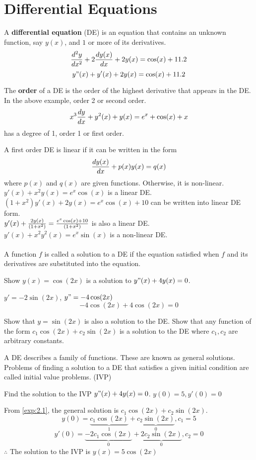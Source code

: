 \documentclass[english, 12pt]{article}
\begin{document}
\section{Differential Equations}
\begin{defn}\label{def:de}
A \textbf{differential equation} (DE) is an equation that contains an unknown function, say $y(x)$, and $1$ or more of its derivatives.
\[ \frac{d^2 y}{dx^2} + 2 \frac{dy(x)}{dx} + 2 y(x) = \cos (x) + 11.2 \]
\[ y"(x) + y'(x) + 2y(x) = \cos(x) + 11.2 \]
\end{defn}
\begin{defn}
The \textbf{order} of a DE is the order of the highest derivative that appears in the DE. In the above example, order 2 or second order.
\[ x^3 \frac{dy}{dx} + y^2(x) + y(x) = e^x + \cos(x) + x \]
has a degree of 1, order 1 or first order.
\end{defn}
A first order DE is linear if it can be written in the form 
\[ \frac{dy(x)}{dx} + p(x)y(x) = q(x) \]
where $p(x)$ and $q(x)$ are given functions. Otherwise, it is non-linear.\\
$y'(x) + x^2 y(x) = e^x\cos(x)$ is a linear DE.\\
$(1+x^2)y'(x) + 2y(x) = e^x \cos(x) + 10$ can be written into linear DE form. \\
$y'(x) + \frac{2y(x)}{(1+x^2)} =\frac{e^x \cos(x) + 10}{(1+x^2)}$ is also a linear DE. \\
$y'(x) + x^2 y^2(x) = e^x\sin(x)$ is a non-linear DE.\\\\
A function $f$ is called a solution to a DE if the equation satisfied when $f$ and its derivatives are substituted into the equation.
\begin{exmp}\label{exp:2.1}
Show $y(x) = \cos(2x)$ is a solution to $y"(x) + 4y(x) = 0$.
\begin{sol}
$y'=-2 \sin(2x)$, $y" = -4 \cos(2x)$
\[-4 \cos(2x) + 4 \cos(2x) = 0 \]
\end{sol}
\begin{exercise}
Show that $y=\sin(2x)$ is also a solution to the DE. Show that any function of the form $c_{1}\cos(2x) + c_{2}\sin(2x)$ is a solution to the DE where $c_{1},c_{2}$ are arbitrary constants.
\end{exercise}
\end{exmp}
\begin{note}
A DE describes a family of functions. These are known as general solutions. Problems of finding a solution to a DE that satisfies a given initial condition are called initial value problems. (IVP)
\end{note}
\begin{exmp}
Find the solution to the IVP $y"(x) + 4y(x) = 0$. $y(0) = 5, y'(0) = 0$
\end{exmp}
\begin{sol}
From \ref{exp:2.1}, the general solution is $c_{1}\cos(2x) + c_{2}\sin(2x)$.
\[y(0)=\underbrace{c_{1}\cos(2x)}_{1} + \underbrace{c_{2}\sin(2x)}_{0}, c_{1} = 5 \]
\[y'(0)=\underbrace{-2 c_{1}\cos(2x)}_{0} + \underbrace{2 c_{2}\sin(2x)}_{0}, c_{2} = 0 \]
$\therefore$ The solution to the IVP is $y(x) = 5 \cos(2x)$
\end{sol}
\end{document}
